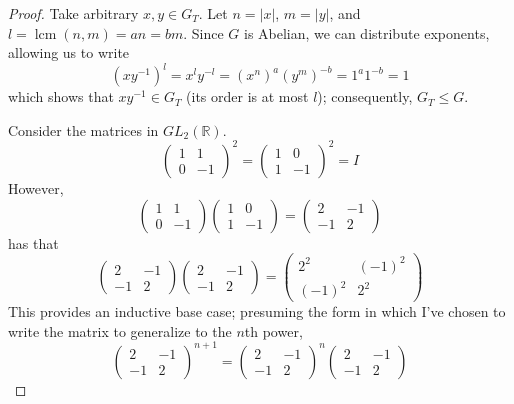 \documentclass{article}
\DeclareMathOperator{\lcm}{lcm}
\begin{document}
\begin{proof}
  Take arbitrary $x,y\in G_{T}$.
  Let $n = |x|$, $m = |y|$, and $l=\lcm(n, m) = an = bm$.
  Since $G$ is Abelian, we can distribute exponents, allowing us to write
  \[
    (xy^{-1})^{l} = x^{l}y^{-l} = (x^{n})^{a}(y^{m})^{-b} = 1^{a}1^{-b} = 1
  \]
  which shows that $xy^{-1}\in G_{T}$ (its order is at most $l$); consequently, $G_{T}\leq G$.

  Consider the matrices in $GL_{2}(\mathbb{R})$.
  \[
    \begin{pmatrix}
      1 & 1 \\
      0 & -1
    \end{pmatrix}^{2}
    =
    \begin{pmatrix}
      1 & 0 \\
      1 & -1
    \end{pmatrix}^{2}
    =
    I
  \]
  However,
  \[
    \begin{pmatrix}
      1 & 1 \\
      0 & -1
    \end{pmatrix}
    \begin{pmatrix}
      1 & 0 \\
      1 & -1
    \end{pmatrix}
    =
    \begin{pmatrix}
      2 & -1 \\
      -1 & 2
    \end{pmatrix}
  \]
  has that
  \[
    \begin{pmatrix}
      2 & -1 \\
      -1 & 2
    \end{pmatrix}
    \begin{pmatrix}
      2 & -1 \\
      -1 & 2
    \end{pmatrix}
    =
    \begin{pmatrix}
      2^{2} & (-1)^{2} \\
      (-1)^{2} & 2^{2}
    \end{pmatrix}
  \]
  This provides an inductive base case; presuming the form in which I've chosen to write the matrix to generalize to the $n$th power,
  \[
    \begin{pmatrix}
      2 & -1 \\
      -1 & 2

    \end{pmatrix}^{n+1}
    =
    \begin{pmatrix}
      2 & -1 \\
      -1 & 2
    \end{pmatrix}^{n}
    \begin{pmatrix}
      2 & -1 \\
      -1 & 2


\end{pmatrix}\]
\end{proof}
\end{document}
